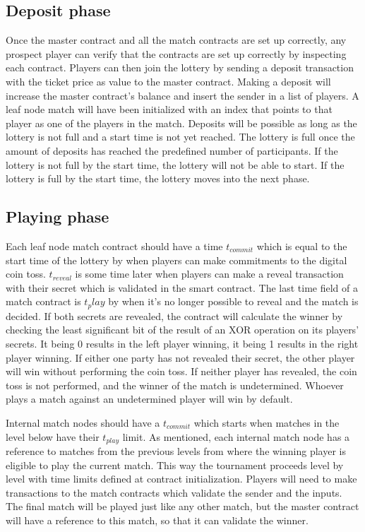 \subsection{Deposit phase}
Once the master contract and all the match contracts are set up correctly, any prospect player can verify that the contracts are set up correctly by inspecting each contract. Players can then join the lottery by sending a deposit transaction with the ticket price as value to the master contract. Making a deposit will increase the master contract's balance and insert the sender in a list of players. A leaf node match will have been initialized with an index that points to that player as one of the players in the match. Deposits will be possible as long as the lottery is not full and a start time is not yet reached. The lottery is full once the amount of deposits has reached the predefined number of participants. If the lottery is not full by the start time, the lottery will not be able to start. If the lottery is full by the start time, the lottery moves into the next phase.

\subsection{Playing phase}
Each leaf node match contract should have a time $t_{commit}$ which is equal to the start time of the lottery by when players can make commitments to the digital coin toss. $t_{reveal}$ is some time later when players can make a reveal transaction with their secret which is validated in the smart contract. The last time field of a match contract is $t_play$ by when it's no longer possible to reveal and the match is decided. If both secrets are revealed, the contract will calculate the winner by checking the least significant bit of the result of an XOR operation on its players' secrets. It being 0 results in the left player winning, it being 1 results in the right player winning. If either one party has not revealed their secret, the other player will win without performing the coin toss. If neither player has revealed, the coin toss is not performed, and the winner of the match is undetermined. Whoever plays a match against an undetermined player will win by default.

Internal match nodes should have a $t_{commit}$ which starts when matches in the level below have their $t_{play}$ limit. As mentioned, each internal match node has a reference to matches from the previous levels from where the winning player is eligible to play the current match. This way the tournament proceeds level by level with time limits defined at contract initialization. Players will need to make transactions to the match contracts which validate the sender and the inputs. The final match will be played just like any other match, but the master contract will have a reference to this match, so that it can validate the winner.

